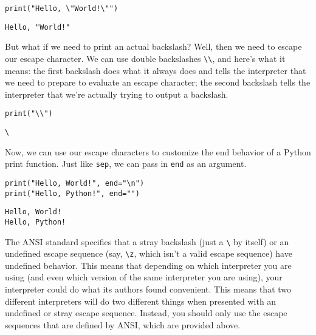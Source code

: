 \begin{lstlisting}[style=pippython]
print("Hello, \"World!\"")
\end{lstlisting}
\begin{lstlisting}
Hello, "World!"
\end{lstlisting}
But what if we need to print an actual backslash? Well, then we need to escape our escape character. We can use double backslashes \verb|\\|, and here's what it means: the first backslash does what it always does and tells the interpreter that we need to prepare to evaluate an escape character; the second backslash tells the interpreter that we're actually trying to output a backslash.
\begin{lstlisting}[style=pippython]
print("\\")
\end{lstlisting}
\begin{lstlisting}
\
\end{lstlisting}
Now, we can use our escape characters to customize the end behavior of a Python print function. Just like \verb|sep|, we can pass in \verb|end| as an argument.
\begin{lstlisting}[style=pippython]
print("Hello, World!", end="\n")
print("Hello, Python!", end="")
\end{lstlisting}
\begin{lstlisting}
Hello, World!
Hello, Python!
\end{lstlisting}
The ANSI standard specifies that a stray backslash (just a \verb|\| by itself) or an undefined escape sequence (say, \verb|\z|, which isn't a valid escape sequence) have undefined behavior. This means that depending on which interpreter you are using (and even which version of the same interpreter you are using), your interpreter could do what its authors found convenient. This means that two different interpreters will do two different things when presented with an undefined or stray escape sequence. Instead, you should only use the escape sequences that are defined by ANSI, which are provided above.
